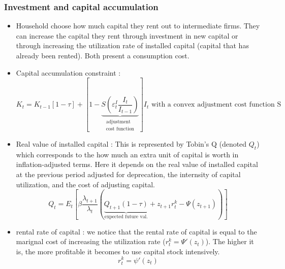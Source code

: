 \documentclass{article}
\begin{document}
\subsubsection{Investment and capital accumulation}
\begin{itemize}
    \item Household choose how much capital they rent out to intermediate firms. They can increase the capital they rent through investment in new capital or through increasing the utilization rate of installed capital (capital that has already been rented). Both present a consumption cost. 
    \item Capital accumulation constraint : 
    \begin{equation}
        K_t = K_{t-1} [1 - \tau] + \left[1 - \underbrace{S\left(\varepsilon_t^I \frac{I_t}{I_{t-1}}\right)}_{\substack{\text{adjustment} \\ \text{cost function}}}\right] I_t  \text{ with a convex adjustment cost function S}
    \end{equation}
    \item Real value of installed capital : This is represented by Tobin's Q (denoted $Q_t$) which corresponds to the how much an extra unit of capital is worth in inflation-adjusted terms. Here it depends on the real value of installed capital at the previous period adjusted for deprecation, the internsity of capital utilization, and the cost of adjusting capital. 
    \begin{equation}
        Q_t = E_t \left[ \beta \frac{\lambda_{t+1}}{\lambda_t} \left( \underbrace{Q_{t+1}(1 - \tau)}_{\text{expected future val.}} + z_{t+1} r_t^k - \Psi(z_{t+1}) \right) \right]  
    \end{equation}
    \item rental rate of capital : we notice that the rental rate of capital is equal to the marignal cost of increasing the utilization rate ($r_t^k = \Psi'(z_t)$). The higher it is, the more profitable it becomes to use capital stock intensively. 
    \begin{equation}
        r_t^k =\psi'(z_t) 
    \end{equation}
\end{itemize}
\end{document}
